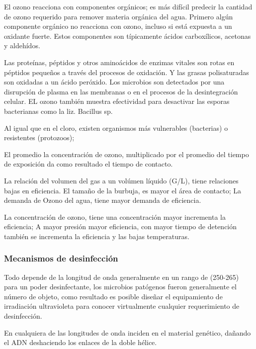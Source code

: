 El ozono reacciona con componentes orgánicos; es más difícil predecir la cantidad de ozono requerido para remover materia orgánica del agua. Primero algún componente orgánico no reacciona con ozono, incluso si está expuesta a un oxidante fuerte. Estos componentes son típicamente ácidos carboxílicos, acetonas y aldehídos.

Las proteínas, péptidos y otros aminoácidos de enzimas vitales son rotas en péptidos pequeños a través del procesos de oxidación. Y las grasas polisaturadas son oxidadas a un ácido peróxido. Los microbios son detectados por una disrupción de plasma en las membranas o en el procesos de la desintegración celular. EL ozono también muestra efectividad para desactivar las esporas bacterianas como la liz. Bacillus sp.

Al igual que en el cloro, existen organismos más vulnerables (bacterias) o resistentes (protozoos); 

El promedio la concentración de ozono, multiplicado por el promedio del tiempo de exposición da como resultado el tiempo de contacto.

La relación del volumen del gas a un volúmen líquido (G/L), tiene relaciones bajas en eficiencia. El tamaño de la burbuja, es mayor el área de contacto; La demanda de Ozono del agua, tiene mayor demanda de eficiencia. 

La concentración de ozono, tiene una concentración mayor incrementa la eficiencia; A mayor presión mayor eficiencia, con mayor tiempo de detención también se incrementa la eficiencia y las bajas temperaturas.    

\subsubsection{Mecanismos de desinfección}
Todo depende de la longitud de onda generalmente en un rango de (250-265) para un poder desinfectante, los microbios patógenos fueron generalmente el número de objeto, como resultado es posible diseñar el equipamiento de irradiación ultravioleta para conocer virtualmente cualquier requerimiento de desinfección.

En cualquiera de las longitudes de onda inciden en el material genético, dañando el ADN deshaciendo los enlaces de la doble hélice.

